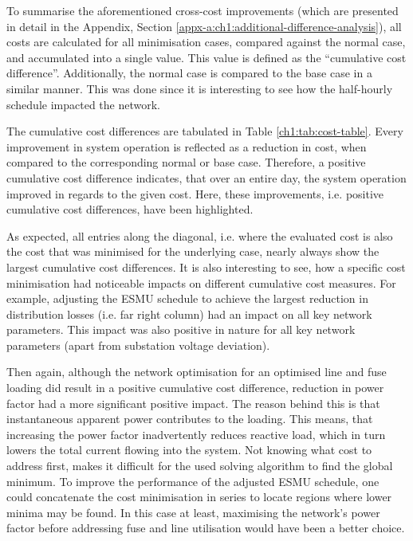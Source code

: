 To summarise the aforementioned cross-cost improvements (which are presented in detail in the Appendix, Section \ref{appx-a:ch1:additional-difference-analysis}), all costs are calculated for all minimisation cases, compared against the normal case, and accumulated into a single value.
This value is defined as the ``cumulative cost difference''.
Additionally, the normal case is compared to the base case in a similar manner.
This was done since it is interesting to see how the half-hourly schedule impacted the network.



The cumulative cost differences are tabulated in Table \ref{ch1:tab:cost-table}.
Every improvement in system operation is reflected as a reduction in cost, when compared to the corresponding normal or base case.
Therefore, a positive cumulative cost difference indicates, that over an entire day, the system operation improved in regards to the given cost.
Here, these improvements, i.e. positive cumulative cost differences, have been highlighted.

As expected, all entries along the diagonal, i.e. where the evaluated cost is also the cost that was minimised for the underlying case, nearly always show the largest cumulative cost differences.
It is also interesting to see, how a specific cost minimisation had noticeable impacts on different cumulative cost measures.
For example, adjusting the ESMU schedule to achieve the largest reduction in distribution losses (i.e. far right column) had an impact on all key network parameters.
This impact was also positive in nature for all key network parameters (apart from substation voltage deviation).

Then again, although the network optimisation for an optimised line and fuse loading did result in a positive cumulative cost difference, reduction in power factor had a more significant positive impact.
The reason behind this is that instantaneous apparent power contributes to the loading.
This means, that increasing the power factor inadvertently reduces reactive load, which in turn lowers the total current flowing into the system.
Not knowing what cost to address first, makes it difficult for the used solving algorithm to find the global minimum.
To improve the performance of the adjusted ESMU schedule, one could concatenate the cost minimisation in series to locate regions where lower minima may be found.
In this case at least, maximising the network's power factor before addressing fuse and line utilisation would have been a better choice.

